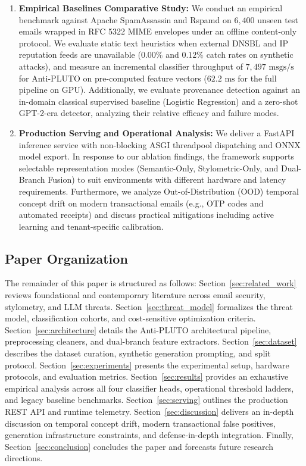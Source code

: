 \documentclass[journal]{IEEEtran}
\begin{document}
\begin{enumerate}
    \item \textbf{Empirical Baselines Comparative Study:} We conduct an empirical benchmark against Apache SpamAssassin and Rspamd on $6,400$ unseen test emails wrapped in RFC 5322 MIME envelopes under an offline content-only protocol. We evaluate static text heuristics when external DNSBL and IP reputation feeds are unavailable ($0.00\%$ and $0.12\%$ catch rates on synthetic attacks), and measure an incremental classifier throughput of $7{,}497\text{ msgs/s}$ for Anti-PLUTO on pre-computed feature vectors ($62.2\text{ ms}$ for the full pipeline on GPU). Additionally, we evaluate provenance detection against an in-domain classical supervised baseline (Logistic Regression) and a zero-shot GPT-2-era detector, analyzing their relative efficacy and failure modes.
    \item \textbf{Production Serving and Operational Analysis:} We deliver a FastAPI inference service with non-blocking ASGI threadpool dispatching and ONNX model export. In response to our ablation findings, the framework supports selectable representation modes (Semantic-Only, Stylometric-Only, and Dual-Branch Fusion) to suit environments with different hardware and latency requirements. Furthermore, we analyze Out-of-Distribution (OOD) temporal concept drift on modern transactional emails (e.g., OTP codes and automated receipts) and discuss practical mitigations including active learning and tenant-specific calibration.
\end{enumerate}



\subsection{Paper Organization}
The remainder of this paper is structured as follows: Section~\ref{sec:related_work} reviews foundational and contemporary literature across email security, stylometry, and LLM threats. Section~\ref{sec:threat_model} formalizes the threat model, classification cohorts, and cost-sensitive optimization criteria. Section~\ref{sec:architecture} details the Anti-PLUTO architectural pipeline, preprocessing cleaners, and dual-branch feature extractors. Section~\ref{sec:dataset} describes the dataset curation, synthetic generation prompting, and split protocol. Section~\ref{sec:experiments} presents the experimental setup, hardware protocols, and evaluation metrics. Section~\ref{sec:results} provides an exhaustive empirical analysis across all four classifier heads, operational threshold ladders, and legacy baseline benchmarks. Section~\ref{sec:serving} outlines the production REST API and runtime telemetry. Section~\ref{sec:discussion} delivers an in-depth discussion on temporal concept drift, modern transactional false positives, generation infrastructure constraints, and defense-in-depth integration. Finally, Section~\ref{sec:conclusion} concludes the paper and forecasts future research directions.
\end{document}
